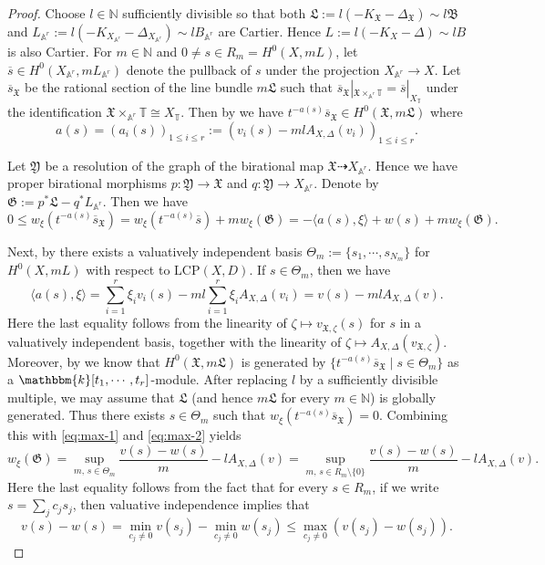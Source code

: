 \documentclass[reqno, 12pt]{amsart}
\theoremstyle{definition}
\newcommand{\bA}{\mathbb{A}}
\newcommand{\bN}{\mathbb{N}}
\newcommand{\bT}{\mathbb{T}}
\newcommand{\bk}{\mathbbm{k}}
\newcommand{\fX}{\mathfrak{X}}
\newcommand{\fL}{\mathfrak{L}}
\newcommand{\fY}{\mathfrak{Y}}
\newcommand{\fG}{\mathfrak{G}}
\newcommand{\fB}{\mathfrak{B}}
\newcommand{\os}{\overline{s}}
\newcommand{\LCP}{\mathrm{LCP}}
\numberwithin{equation}{section}
\begin{document}
\begin{proof}
Choose $l\in \bN$ sufficiently divisible so that both $\fL:=l(-K_{\fX}-\Delta_{\fX})\sim l \fB$ and $L_{\bA^r}:=l (-K_{X_{\bA^r}}-\Delta_{X_{\bA^r}})\sim l B_{\bA^r}$ are Cartier. Hence $L:= l(-K_X-\Delta)\sim lB$ is also Cartier. 
For $m\in \bN$ and $0\neq s\in R_m = H^0(X, mL)$, let $\os \in H^0(X_{\bA^r}, m L_{\bA^r})$ denote the pullback of $s$ under the projection $X_{\bA^r}\to X$. Let $\os_{\fX}$ be the rational section of the line bundle $m\fL$ such that $\os_{\fX}|_{\fX\times_{\bA^r} \bT} = \os|_{X_{\bT}}$ under the identification $\fX\times_{\bA^r} \bT\cong X_{\bT}$. 
Then by \cite[Proposition 3.17]{BL26} we have $t^{-a(s)}\os_{\fX} \in H^0(\fX, m\fL)$ where 
\[
a(s) = (a_i(s))_{1\leq i\leq r} := (v_i(s)-ml A_{X,\Delta}(v_i))_{1\leq i\leq r}.
\]


Let $\fY$ be a resolution of the graph of the birational map $\fX\dashrightarrow X_{\bA^r}$. Hence we have proper birational morphisms $p: \fY \to \fX$ and $q:\fY \to X_{\bA^r}$. Denote by $\fG:=p^*\fL - q^* L_{\bA^r}$. Then we have 
\begin{equation}\label{eq:max-1}
    0 \leq w_{\xi}(t^{-a(s)}\os_{\fX}) = w_{\xi}(t^{-a(s)} \os) + m w_{\xi} (\fG) = - \langle a(s), \xi \rangle + w(s) + m w_{\xi} (\fG). 
\end{equation}

Next, by \cite{BL26} there exists a valuatively independent basis $\Theta_m:=\{s_1, \cdots, s_{N_m}\}$ for $H^0(X, mL)$ with respect to $\LCP(X,D)$. If $s\in \Theta_m$, then we have 
\begin{equation}\label{eq:max-2}
    \langle a(s), \xi\rangle = \sum_{i=1}^r \xi_i v_i(s) - ml \sum_{i=1}^r \xi_i A_{X,\Delta}(v_i)  = v(s) - ml A_{X,\Delta}(v). 
\end{equation}
Here the last equality follows from the linearity of $\zeta\mapsto v_{\fX,\zeta}(s)$ for $s$ in a valuatively independent basis, together with the linearity of $\zeta\mapsto A_{X,\Delta}(v_{\fX,\zeta})$.
Moreover, by \cite[Proposition 3.17]{BL26} we know that $H^0(\fX, m\fL)$ is generated by $\{t^{-a(s)} \os_{\fX}\mid s\in \Theta_m\}$ as a $\bk[t_1,\cdots, t_r]$-module. After replacing $l$ by a sufficiently divisible multiple, we may assume that $\fL$ (and hence $m\fL$ for every $m\in \bN$) is globally generated. 
Thus there exists $s\in \Theta_m$ such that $w_{\xi}(t^{-a(s)} \os_{\fX}) = 0$. Combining this with \eqref{eq:max-1} and \eqref{eq:max-2} yields
\begin{equation}\label{eq:max-3}
    w_{\xi}(\fG) = \sup_{m,\,s\in \Theta_m} \frac{v(s) - w(s)}{m} - l A_{X,\Delta}(v)
    = \sup_{m,\,s\in R_m\setminus\{0\}} \frac{v(s) - w(s)}{m} - l A_{X,\Delta}(v).
\end{equation}
Here the last equality follows from the fact that for every $s\in R_m$, if we write $s = \sum_{j} c_j s_j$, then valuative independence implies that 
\[
v(s) - w(s) = \min_{c_j\neq 0} v(s_j) - \min_{c_j\neq 0} w(s_j) \leq  \max_{c_j\neq 0} (v(s_j) - w(s_j)).
\]


\end{proof}
\end{document}
